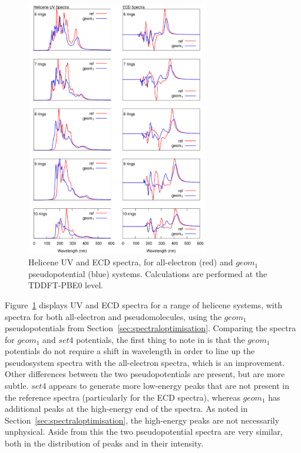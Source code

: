 \documentclass[aip,reprint,nofootinbib]{revtex4-1}
\begin{document}
\begin{figure}
\begin{center}
\includegraphics[width=8cm]{pbe0_grand_rpas_geom1.png}
\end{center}
\caption[Computed all-electron and pseudopotential spectra for helicenes: $geom_1$]{Helicene UV and ECD spectra, for all-electron (red) and $geom_1$ pseudopotential (blue) systems. Calculations are performed at the TDDFT-PBE0 level.}\label{fig:helispectrageom1}
\end{figure}

Figure~\ref{fig:helispectrageom1} displays UV and ECD spectra for a range of helicene systems, with spectra for both all-electron and pseudomolecules, using the $geom_1$ pseudopotentials from Section~\ref{sec:spectraloptimisation}. Comparing the spectra for $geom_1$ and $set4$ potentials, the first thing to note in is that the $geom_1$ potentials do not require a shift in wavelength in order to line up the pseudosystem spectra with the all-electron spectra, which is an improvement. Other differences between the two pseudopotentials are present, but are more subtle. $set4$ appears to generate more low-energy peaks that are not present in the reference spectra (particularly for the ECD spectra), whereas $geom_1$ has additional peaks at the high-energy end of the spectra. As noted in Section~\ref{sec:spectraloptimisation}, the high-energy peaks are not necessarily unphysical. Aside from this the two pseudopotential spectra are very similar, both in the distribution of peaks and in their intensity.
\end{document}
